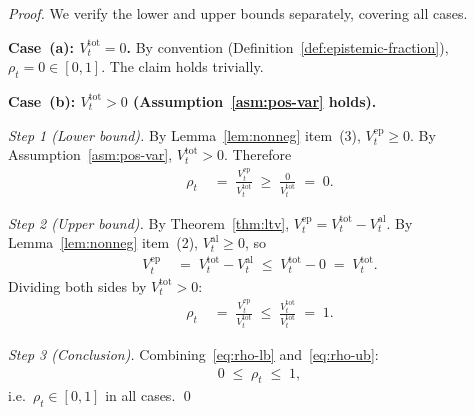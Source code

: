 \documentclass[12pt,openany]{book}
\numberwithin{equation}{chapter}
\theoremstyle{plain}
\theoremstyle{definition}
\theoremstyle{remark}
\numberwithin{equation}{chapter}
\theoremstyle{plain}
\begin{document}
\begin{proof}
We verify the lower and upper bounds separately, covering all cases.

\medskip
\noindent\textbf{Case~(a): $V^{\mathrm{tot}}_t = 0$.}
By convention (Definition~\ref{def:epistemic-fraction}),
$\rho_t = 0 \in [0, 1]$.  The claim holds trivially.

\medskip
\noindent\textbf{Case~(b): $V^{\mathrm{tot}}_t > 0$
(Assumption~\ref{asm:pos-var} holds).}

\medskip
\noindent\emph{Step 1 (Lower bound).}
By Lemma~\ref{lem:nonneg} item~(3), $V^{\mathrm{ep}}_t \geq 0$.
By Assumption~\ref{asm:pos-var}, $V^{\mathrm{tot}}_t > 0$.
Therefore
\begin{align}
  \rho_t
  &\;=\; \frac{V^{\mathrm{ep}}_t}{V^{\mathrm{tot}}_t}
   \;\geq\; \frac{0}{V^{\mathrm{tot}}_t}
   \;=\; 0.
  \label{eq:rho-lb}
\end{align}

\noindent\emph{Step 2 (Upper bound).}
By Theorem~\ref{thm:ltv},
$V^{\mathrm{ep}}_t = V^{\mathrm{tot}}_t - V^{\mathrm{al}}_t$.
By Lemma~\ref{lem:nonneg} item~(2), $V^{\mathrm{al}}_t \geq 0$,
so
\begin{align}
  V^{\mathrm{ep}}_t
  &\;=\; V^{\mathrm{tot}}_t - V^{\mathrm{al}}_t
   \;\leq\; V^{\mathrm{tot}}_t - 0
   \;=\; V^{\mathrm{tot}}_t.
  \label{eq:Vep-ub}
\end{align}
Dividing both sides by $V^{\mathrm{tot}}_t > 0$:
\begin{align}
  \rho_t
  &\;=\; \frac{V^{\mathrm{ep}}_t}{V^{\mathrm{tot}}_t}
   \;\leq\; \frac{V^{\mathrm{tot}}_t}{V^{\mathrm{tot}}_t}
   \;=\; 1.
  \label{eq:rho-ub}
\end{align}

\noindent\emph{Step 3 (Conclusion).}
Combining~\eqref{eq:rho-lb} and~\eqref{eq:rho-ub}:
\begin{align}
  0 \;\leq\; \rho_t \;\leq\; 1,
  \label{eq:rho-bounded}
\end{align}
i.e.\ $\rho_t \in [0, 1]$ in all cases. \qed
\end{proof}
\end{document}
